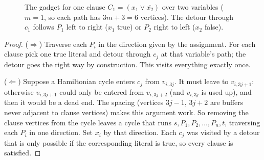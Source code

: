\begin{figure}[H]
\centering
{}
\caption{The gadget for one clause $C_1=(x_1\lor\overline{x_2})$ over two
variables ($m=1$, so each path has $3m+3=6$ vertices). The detour through
$c_1$ follows $P_1$ left to right ($x_1$ true) or $P_2$ right to left
($x_2$ false).}
\end{figure}
\begin{proof}
($\Rightarrow$) Traverse each $P_i$ in the direction given by the assignment. For each clause pick one true literal and detour through $c_j$ at that variable's
path; the detour goes the right way by construction. This visits everything exactly once.

($\Leftarrow$) Suppose a Hamiltonian cycle enters $c_j$ from $v_{i,3j}$. It must leave to $v_{i,3j+1}$: otherwise $v_{i,3j+1}$ could only be entered from
$v_{i,3j+2}$ (and $v_{i,3j}$ is used up), and then it would be a dead end. The spacing (vertices $3j-1$, $3j+2$ are buffers never adjacent to clause vertices) makes this argument
work. So removing the clause vertices from the cycle leaves a cycle that runs $s,P_1,P_2,\dots,P_n,t$, traversing each $P_i$ in one direction. Set $x_i$ by
that direction. Each $c_j$ was visited by a detour that is only possible if the corresponding literal is true, so every clause is satisfied.
\end{proof}

